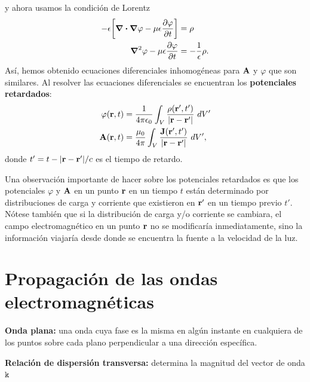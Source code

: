 y ahora usamos la condición de Lorentz
\begin{align}
-\epsilon\qty[\div{\grad{\varphi}}-\mu\epsilon\pdv{\varphi}{t}]&=\rho\\
\grad^2\varphi-\mu\epsilon\pdv{\varphi}{t}&=-\frac{1}{\epsilon}\rho.
\end{align}
Así, hemos obtenido ecuaciones diferenciales inhomogéneas
para $\vb{A}$ y $\varphi$ que son similares. Al resolver 
las ecuaciones diferenciales se encuentran los \textbf{potenciales
retardados}:
\begin{align}
\varphi(\vb{r},t)&=\frac{1}{4\pi	\epsilon_0}\int_V\frac{\rho(\vb{r}',t')}
{\abs{\vb{r}-\vb{r}'}}\ dV'\\
\vb{A}(\vb{r},t)&= \frac{\mu_0}{4\pi	}
\int_V\frac{\vb{J}(\vb{r}',t')}
{\abs{\vb{r}-\vb{r}'}}\ dV',
\end{align}
donde $t'=t-\abs{\vb{r}-\vb{r}'}/c$ es el tiempo de retardo.

Una observación importante de hacer sobre los potenciales retardados 
es que los potenciales $\varphi$ y $\vb{A}$ en un punto $\vb{r}$ en un 
tiempo $t$ están determinado por distribuciones de carga y corriente 
que existieron en $\vb{r}'$ en un tiempo previo $t'$. Nótese también 
que si la distribución de carga y/o corriente se cambiara, el campo 
electromagnético en un punto $\vb{r}$ no se modificaría inmediatamente,
sino la información viajaría desde donde se encuentra la fuente a la velocidad
de la luz.

\section{Propagación de las ondas electromagnéticas}
\textbf{Onda plana:} una onda cuya fase es la misma en algún instante
en cualquiera de los puntos sobre cada plano perpendicular a una 
dirección específica. 

\textbf{Relación de dispersión transversa:} determina la magnitud 
del vector de onda $\mathtt{k}$
